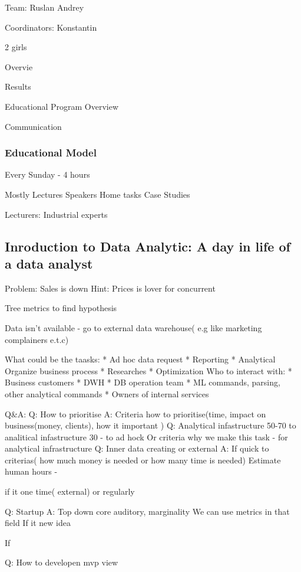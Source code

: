 \documentclass[12pt, a4paper, oneside]{article}
\begin{document}
Team:
Ruslan 
Andrey 

Coordinators:
Konstantin

2 girls

Overvie

Results

Educational Program Overview

Communication

\subsubsection{Educational Model}

Every Sunday  - 4 hours

Mostly Lectures
Speakers
Home tasks
Case Studies 

Lecturers: Industrial experts




\subsection{Inroduction to Data Analytic: A day in life of a data analyst}

Problem: Sales is down
Hint: Prices is lover for concurrent 


Tree metrics to find hypothesis 

Data isn't available - go to external data  warehouse( e.g like marketing complainers e.t.c)  



What could be the taasks:
* Ad hoc data request
* Reporting
* Analytical 
Organize business process
* Researches
* Optimization
Who to interact with:
* Business customers
* DWH
* DB operation team
* ML commands, parsing, other analytical commands
* Owners of internal services 

Q&A:
Q: How to prioritise
A: Criteria how to prioritise(time, impact on business(money, clients), how it important )
Q: Analytical infastructure 50-70 to analitical infastructure
30 - to ad hock 
Or criteria why we make this task - for analytical infrastructure 
Q: Inner data creating or external
A: If quick to criterias( how much money is needed or how many time is needed) 
Estimate human hours - 

if it one time( external) or regularly

Q: Startup
A: Top down core auditory, marginality
We can use metrics in that field 
If it new idea

If 

Q: How to developen mvp view
\end{document}
